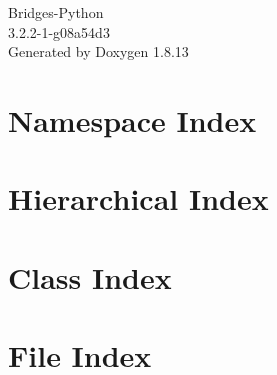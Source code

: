 \documentclass[twoside]{book}
\newcommand{\+}{\discretionary{\mbox{\scriptsize$\hookleftarrow$}}{}{}}
\newcommand{\clearemptydoublepage}{%
  \newpage{\pagestyle{empty}\cleardoublepage}%
}
\begin{document}
\hypersetup{pageanchor=false,
             bookmarksnumbered=true,
             pdfencoding=unicode
            }
\begin{titlepage}
\vspace*{7cm}
\begin{center}%
{\Large Bridges-\/\+Python \\[1ex]\large 3.\+2.\+2-\/1-\/g08a54d3 }\\
\vspace*{1cm}
{\large Generated by Doxygen 1.8.13}\\
\end{center}
\end{titlepage}
\clearemptydoublepage
{}
\tableofcontents
\clearemptydoublepage
{}
\hypersetup{pageanchor=true}

\chapter{Namespace Index}

\chapter{Hierarchical Index}

\chapter{Class Index}

\chapter{File Index}

\end{document}
